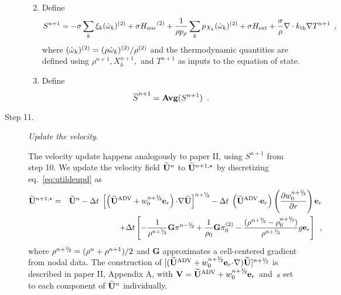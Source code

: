 \begin{description}
\begin{enumerate}
\renewcommand{\theenumi}{{\bf \alph{enumi}}}
\item Define
\begin{equation}
  S^{n+1} =  -\sigma  \sum_k  \xi_k (\dot{\omega}_k)^{(2)}  + \sigma {H_{\rm nuc}}^{(2)} +
  \frac{1}{\rho p_\rho} \sum_k p_{X_k}  ({\dot{\omega}}_k)^{(2)}  
   + \sigma {H_{\rm ext}} + \frac{\sigma}{\rho}\nabla\cdot k_{\rm th}\nabla T^{n+1} \enskip ,
\end{equation}
where $(\dot{\omega}_k)^{(2)} = (\rho \dot{\omega}_k)^{(2)} / \rho^{(2)}$
and the thermodynamic quantities are defined using $\rho^{n+1}, X_k^{n+1},$
and $T^{n+1}$ as inputs to the equation of state.

\item Define
\begin{equation}
\overline{S}^{n+1} = {\mathrm{\bf Avg}} (S^{n+1}) \enskip.
\end{equation}

\end{enumerate}


\item[Step 11.] {\em Update the velocity}.  

The velocity update happens analogously to paper II, using $S^{n+1}$ from step 10.
We update the velocity field $\widetilde{{\bf U}}^n$ to $\widetilde{{\bf U}}^{n+1,\star}$ by discretizing eq.~\ref{eq:utildeupd}
as
\begin{eqnarray}
\Ubt^{n+1,\star} &=& \Ubt^n - \dt \;
 \left[\left(\uadvtwo+ w_0^{\nph} \er\right) \cdotb \nablab \Ubt \right]^\nph
      - \dt \; \left(\uadvtwo \cdotb \er\right)  \left(\frac{\partial w_0^{\nph}}{\partial r} \right) \er \nonumber \\
   &&   + \dt \left[ - \frac{1}{\rho^\nph} {\mathbf{G}} \pi^\nmh
        + \frac{1}{\rho_0} {\mathbf{G}} \pizerotwo
        - \frac{(\rho^\nph-\rhozero^\nph)}{\rho^\nph} g \er \right] \enskip ,
\end{eqnarray}
where $\rho^\nph = ( \rho^n + \rho^{n+1} )/2$
and $\mathbf{G}$ approximates a cell-centered gradient from nodal data. 
The construction of $[(\uadvtwo+ w_0^{\nph} \er \cdotb \nablab) \Ubt ]^\nph$
is described in paper II, Appendix A, with $\Vb = \uadvtwo+w_0^{\nph} \er$ and~$s$ set to each
component of $\widetilde{{\bf U}}^n$ individually.


\end{description}
